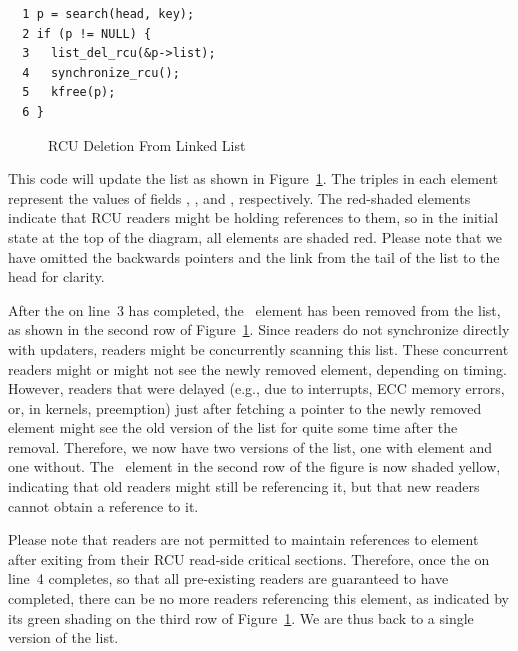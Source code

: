 \vspace{5pt}
\begin{minipage}[t]{\columnwidth}
\scriptsize
\begin{verbatim}
  1 p = search(head, key);
  2 if (p != NULL) {
  3   list_del_rcu(&p->list);
  4   synchronize_rcu();
  5   kfree(p);
  6 }
\end{verbatim}
\end{minipage}
\vspace{5pt}

\begin{figure}[tb]
\begin{center}
\end{center}
\caption{RCU Deletion From Linked List}
\label{fig:defer:RCU Deletion From Linked List}
\end{figure}

This code will update the list as shown in
Figure~\ref{fig:defer:RCU Deletion From Linked List}.
The triples in each element represent the values of fields ,
, and , respectively.
The red-shaded elements
indicate that RCU readers might be holding references to them,
so in the initial state at the top of the diagram, all elements
are shaded red.
Please note that
we have omitted the backwards pointers and the link from the tail
of the list to the head for clarity.

After the  on
line~3 has completed, the ~element
has been removed from the list, as shown in the second row of
Figure~\ref{fig:defer:RCU Deletion From Linked List}.
Since readers do not synchronize directly with updaters,
readers might be concurrently scanning this list.
These concurrent readers might or might not see the newly removed element,
depending on timing.
However, readers that were delayed (e.g., due to interrupts, ECC memory
errors, or, in  kernels, preemption)
just after fetching a pointer to the newly removed element might
see the old version of the list for quite some time after the
removal.
Therefore, we now have two versions of the list, one with element
 and one without.
The ~element in the second row of the figure is now
shaded yellow, indicating
that old readers might still be referencing it, but that new
readers cannot obtain a reference to it.

Please note that readers are not permitted to maintain references to
element~ after exiting from their RCU read-side
critical sections.
Therefore,
once the  on
line~4 completes, so that all pre-existing readers are
guaranteed to have completed,
there can be no more readers referencing this
element, as indicated by its green shading on the third row of
Figure~\ref{fig:defer:RCU Deletion From Linked List}.
We are thus back to a single version of the list.

